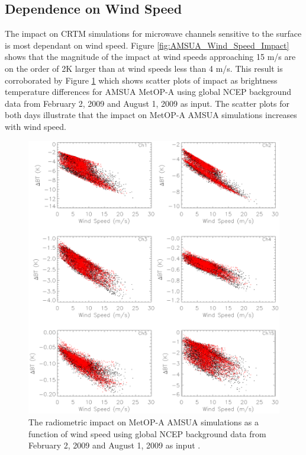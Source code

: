 
\subsection{Dependence on Wind Speed}
The impact on CRTM simulations for microwave channels sensitive to the surface is most dependant on wind speed.  Figure \ref{fig:AMSUA_Wind_Speed_Impact} shows that the magnitude of the impact at wind speeds approaching 15 m/s are on the order of 2K larger than at wind speeds less than 4 m/s.  This result is corroborated by Figure \ref{fig:AMSUA_Background_Impact} which shows scatter plots of impact as brightness temperature differences for AMSUA MetOP-A using global NCEP background data from February 2, 2009 and August 1, 2009 as input.  The scatter plots for both days illustrate that the impact on MetOP-A AMSUA simulations increases with wind speed.

\begin{figure}[htp]
  \centering
  \includegraphics[scale=0.75]{graphics/emissD_windS_f.eps}
  \caption{The radiometric impact on MetOP-A AMSUA simulations as a function of wind speed using global NCEP background data from February 2, 2009 and August 1, 2009 as input .}
  \label{fig:AMSUA_Background_Impact}
\end{figure}

